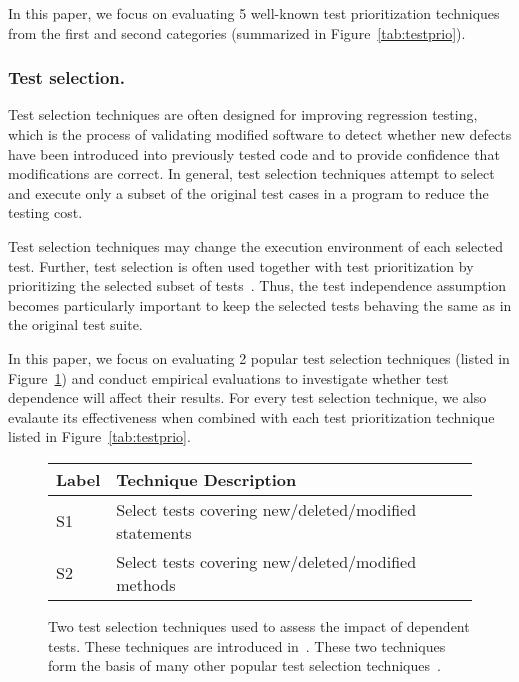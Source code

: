 In this paper, we focus on evaluating 5 well-known test prioritization
techniques from the first and second categories (summarized
in Figure~\ref{tab:testprio}).



\subsubsection{Test selection.}

Test selection techniques are often designed for improving
regression testing, which is the process of validating modified
software to detect whether new defects
have been introduced into previously tested code and
to provide confidence that modifications
are correct. 
In general, test selection techniques attempt to select and execute
only a subset of the original test cases in a program to
reduce the testing cost.


Test selection techniques may change the execution
environment of each selected test. 
Further, test selection is often used together with
test prioritization by prioritizing the selected
subset of tests~\cite{}. Thus, the test independence
assumption becomes particularly important to keep the
selected tests behaving the same as in the original test suite.

In this paper, we focus on evaluating 2 popular test
selection techniques (listed
in Figure~\ref{tab:testsel}) and conduct empirical evaluations
to investigate whether test dependence will affect their results.
For every test selection technique,
we also evalaute its effectiveness when combined with each test
prioritization technique listed in Figure~\ref{tab:testprio}.

\begin{figure}
\centering
\setlength{\tabcolsep}{0.25\tabcolsep}
\begin{tabular}{|l|l|}
\hline
\textbf{Label} & \textbf{Technique Description} \\
\hline
S1 & Select tests covering new/deleted/modified statements\\
S2 & Select tests covering new/deleted/modified methods\\
\hline
\end{tabular}
\caption{Two test selection techniques used
to assess the impact of dependent tests. These
techniques are introduced in~\cite{}. These
two techniques form the basis of many other
popular test selection techniques~\cite{}.
}
\label{tab:testsel}
\end{figure}

